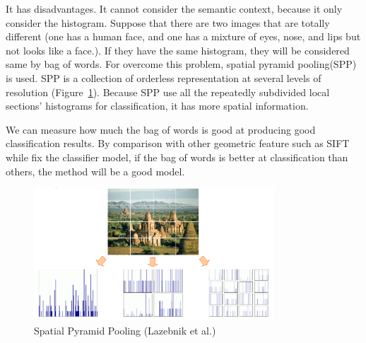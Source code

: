 It has disadvantages. It cannot consider the semantic context, because it only consider the histogram. Suppose that there are two images that are totally different (one has a human face, and one has a mixture of eyes, nose, and lips but not looks like a face.). If they have the same histogram, they will be considered same by bag of words. For overcome this problem, spatial pyramid pooling(SPP) is used. SPP is a collection of orderless representation at several levels of resolution (Figure~\ref{fig2}). Because SPP use all the repeatedly subdivided local sections' histograms for classification, it has more spatial information.


We can measure how much the bag of words is good at producing good classification results. By comparison with other geometric feature such as SIFT while fix the classifier model, if the bag of words is better at classification than others, the method will be a good model.


\begin{figure}[h]
    \centering
    \includegraphics[width=9cm]{questions/SPP.PNG}
    \caption{Spatial Pyramid Pooling (Lazebnik et al.)}
    \label{fig2}
\end{figure}





